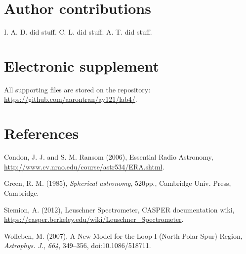 \documentclass[10pt]{article}
\begin{document}
\section{Author contributions}

I. A. D. did stuff.  C. L. did stuff.  A. T. did stuff.

\section{Electronic supplement}

All supporting files are stored on the repository:\\
\href{https://github.com/aarontran/ay121}
{https://github.com/aarontran/ay121/lab4/}.

\section{References}

\hangindent 0.25in Condon, J. J. and S. M. Ransom (2006), Essential Radio Astronomy, \\
\href{http://www.cv.nrao.edu/course/astr534/ERA.shtml}
{http://www.cv.nrao.edu/course/astr534/ERA.shtml}.

\hangindent 0.25in Green, R. M. (1985), \textit{Spherical astronomy}, 520pp.,
Cambridge Univ. Press, Cambridge.

\hangindent 0.25in Siemion, A. (2012), Leuschner Spectrometer, CASPER documentation wiki, \\
\href{https://casper.berkeley.edu/wiki/Leuschner\_Spectrometer}
{https://casper.berkeley.edu/wiki/Leuschner\_Spectrometer}.

\hangindent 0.25in Wolleben, M. (2007), A New Model for the Loop I (North Polar
Spur) Region, \textit{Astrophys. J.}, \textit{664}, 349--356,
doi:10.1086/518711.
\end{document}

